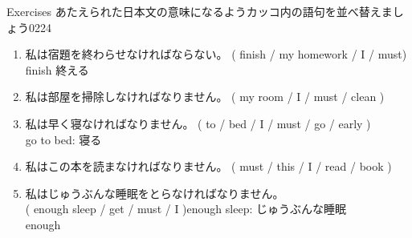 \documentclass[aspectratio=169,xcolor={dvipsnames,table}]{beamer}
\newcommand{\myaudio}[1]{\href{#1}{\faVolumeUp}}
\begin{document}
\begin{frame}[plain]{Exercises}
あたえられた日本文の意味になるようカッコ内の語句を並べ替えましょう\hfill{\tiny 0224}\,{\scriptsize \myaudio{./audio/013_must_02.mp3}}
\begin{enumerate}
 \item {\small 私は宿題を終わらせなければならない。}
( finish / my homework / I / must)\\
\hfill{}{\scriptsize finish  終える}
 \item {\small 私は部屋を掃除しなければなりません。}
( my room / I / must / clean )\\
 \item {\small 私は早く寝なければなりません。}
( to / bed / I / must / go / early )\\
\hfill{}{\scriptsize go to bed: 寝る}
 \item {\small 私はこの本を読まなければなりません。}
( must / this / I / read / book )\\
 \item {\small 私はじゅうぶんな睡眠をとらなければなりません。}\\
( enough sleep / get / must / I )\hfill{\scriptsize enough sleep: じゅうぶんな睡眠}\\
\hfill{}{\scriptsize enough }
\end{enumerate}
\end{frame}
\end{document}
